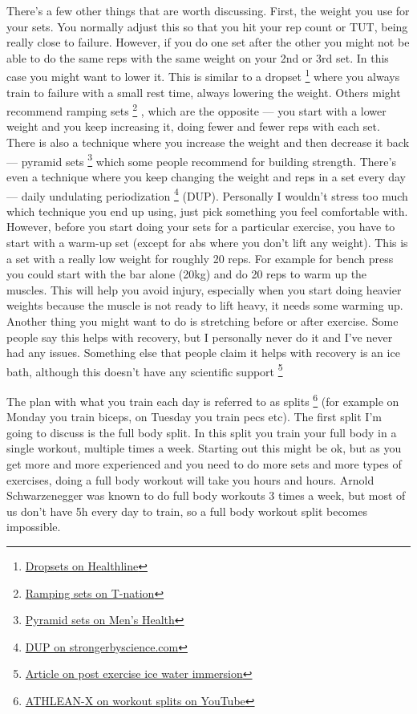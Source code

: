 \documentclass[openany, 12pt]{book}
\begin{document}
        There's a few other things that are worth discussing. First, the weight you use for your sets. You normally adjust this so that you hit your rep count or TUT, being really close to failure.
        However, if you do one set after the other you might not be able to do the same reps with the same weight on your 2nd or 3rd set. In this case you might want to lower it. This is similar to
        a dropset
        \footnote{\href{https://www.healthline.com/nutrition/what-is-a-drop-set}{Dropsets on Healthline}}
        where you always train to failure with a small rest time, always lowering the weight. Others might recommend ramping sets
        \footnote{\href{https://www.t-nation.com/training/thibaudeau-on-ramping/}{Ramping sets on T-nation}}
        , which are the opposite --- you start with a lower weight and you keep increasing it, doing fewer and fewer reps with each set. There is also a technique where you increase the weight and then
        decrease it back --- pyramid sets
        \footnote{\href{https://www.menshealth.com/fitness/a36317637/pyramid-sets/}{Pyramid sets on Men's Health}} which some people recommend for building strength. There's even a technique
        where you keep changing the weight and reps in a set every day --- daily undulating periodization
        \footnote{\href{https://www.strongerbyscience.com/daily-undulating-periodization/}{DUP on strongerbyscience.com}} (DUP). Personally I wouldn't stress too
        much which technique you end up using, just pick something you feel comfortable with. However, before you start doing your sets for a particular exercise, you have to start with a warm-up set
        (except for abs where you don't lift any weight).
        This is a set with a really low weight for roughly 20 reps. For example for bench press you could start with the bar alone (20kg) and do 20 reps to warm up the muscles. This will help you avoid
        injury, especially when you start doing heavier weights because the muscle is not ready to lift heavy, it needs some warming up. Another thing you might want to do is stretching before or
        after exercise. Some people say this helps with recovery, but I personally never do it and I've never had any issues. Something else that people claim it helps with recovery is an ice bath,
        although this doesn't have any scientific support
        \footnote{\href{https://www.ncbi.nlm.nih.gov/pmc/articles/PMC2938508/}{Article on post exercise ice water immersion}}

        The plan with what you train each day is referred to as splits
        \footnote{\href{https://www.youtube.com/watch?v=RDWyqnGhmWY}{ATHLEAN-X on workout splits on YouTube}} (for example on Monday you train biceps, on Tuesday you train pecs etc).
        The first split I'm going to discuss is the full body split. In this split
        you train your full body in a single workout, multiple times a week. Starting out this might be ok, but as you get more and more experienced and you need to do more sets and more types of
        exercises, doing a full body workout will take you hours and hours. Arnold Schwarzenegger was known to do full body workouts 3 times a week, but most of us don't have 5h every day to train, so
        a full body workout split becomes impossible.
\end{document}
